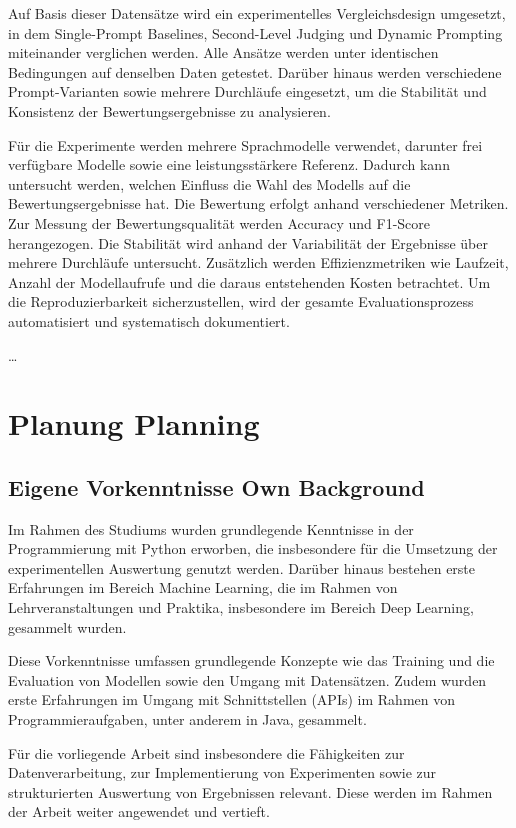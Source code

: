 \documentclass[ngerman]{rwureport}
\begin{document}
{{{{{		Auf Basis dieser Datensätze wird ein experimentelles Vergleichsdesign umgesetzt, in dem Single-Prompt Baselines, Second-Level Judging und Dynamic Prompting miteinander verglichen werden. Alle Ansätze werden unter identischen Bedingungen auf denselben Daten getestet. Darüber hinaus werden verschiedene Prompt-Varianten sowie mehrere Durchläufe eingesetzt, um die Stabilität und Konsistenz der Bewertungsergebnisse zu analysieren.
		
		Für die Experimente werden mehrere Sprachmodelle verwendet, darunter frei verfügbare Modelle sowie eine leistungsstärkere Referenz. Dadurch kann untersucht werden, welchen Einfluss die Wahl des Modells auf die Bewertungsergebnisse hat.
		Die Bewertung erfolgt anhand verschiedener Metriken. Zur Messung der Bewertungsqualität werden Accuracy und F1-Score herangezogen. Die Stabilität wird anhand der Variabilität der Ergebnisse über mehrere Durchläufe untersucht. Zusätzlich werden Effizienzmetriken wie Laufzeit, Anzahl der Modellaufrufe und die daraus entstehenden Kosten betrachtet. Um die Reproduzierbarkeit sicherzustellen, wird der gesamte Evaluationsprozess automatisiert und systematisch dokumentiert.}

\dots

\section{
    {Planung}
    {Planning}}
\label{sec:planning}

\subsection{
    {Eigene Vorkenntnisse}
    {Own Background}}
\label{sub:background}


{
		
		Im Rahmen des Studiums wurden grundlegende Kenntnisse in der Programmierung mit Python erworben, die insbesondere für die Umsetzung der experimentellen Auswertung genutzt werden. Darüber hinaus bestehen erste Erfahrungen im Bereich Machine Learning, die im Rahmen von Lehrveranstaltungen und Praktika, insbesondere im Bereich Deep Learning, gesammelt wurden.
		
		Diese Vorkenntnisse umfassen grundlegende Konzepte wie das Training und die Evaluation von Modellen sowie den Umgang mit Datensätzen. Zudem wurden erste Erfahrungen im Umgang mit Schnittstellen (APIs) im Rahmen von Programmieraufgaben, unter anderem in Java, gesammelt.
		
		Für die vorliegende Arbeit sind insbesondere die Fähigkeiten zur Datenverarbeitung, zur Implementierung von Experimenten sowie zur strukturierten Auswertung von Ergebnissen relevant. Diese werden im Rahmen der Arbeit weiter angewendet und vertieft.
		
}}}}}
\end{document}
